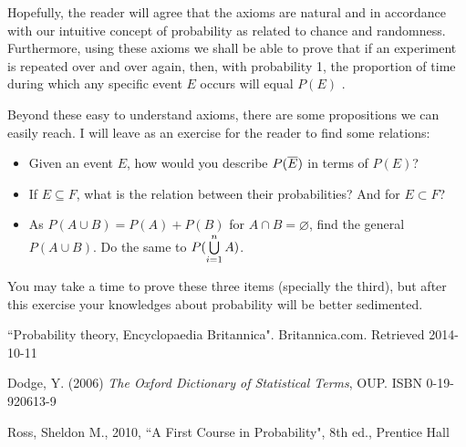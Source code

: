 \documentclass[a4paper,twocolumn]{article}
\begin{document}
\bigskip

Hopefully, the reader will agree that the axioms are natural and in accordance with our intuitive concept of probability as related to chance and randomness. Furthermore, using these axioms we shall be able to prove that if an experiment is repeated over and over again, then, with probability 1, the proportion of time during which any specific event $E$ occurs will equal $P(E)$ \cite{ross_2010}.

Beyond these easy to understand axioms, there are some propositions we can easily reach. I will leave as an exercise for the reader to find some relations:

\begin{itemize}
    \item Given an event $E$, how would you describe $P(\overline{E})$ in terms of $P(E)$?
    \item If $E \subseteq F$, what is the relation between their probabilities? And for $E \subset F$?
    \item As $P(A \cup B) = P(A) + P(B)$ for $A \cap B = \varnothing$, find the general $P(A \cup B)$. Do the same to $P(\bigcup\limits_{i=1}^{n}A)$.
\end{itemize}

\noindent You may take a time to prove these three items (specially the third), but after this exercise your knowledges about probability will be better sedimented.


\begin{thebibliography}{9}
         ``Probability theory, Encyclopaedia Britannica".
         Britannica.com.
         Retrieved 2014-10-11

        Dodge, Y. (2006)
        \textit{The Oxford Dictionary of Statistical Terms}, OUP.
        ISBN 0-19-920613-9

        Ross, Sheldon M.,
        2010,
        ``A First Course in Probability", 8th ed.,
        Prentice Hall
\end{thebibliography}
\end{document}
